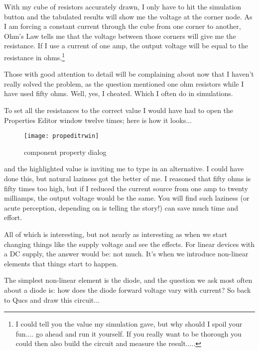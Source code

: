 \addvspace{12pt}

With my cube of resistors accurately drawn, I only have to hit the
simulation button and the tabulated results will show me the voltage
at the corner node.  As I am forcing a constant current through the
cube from one corner to another, Ohm's Law tells me that the voltage
between those corners will give me the resistance.  If I use a current
of one amp, the output voltage will be equal to the resistance in
ohms.\footnote{I could tell you the value my simulation gave, but why
should I spoil your fun.... go ahead and run it yourself. If you
really want to be thorough you could then also build the circuit and
measure the result.....}

\addvspace{12pt}

Those with good attention to detail will be complaining about now that
I haven't really solved the problem, as the question mentioned one ohm
resistors while I have used fifty ohms.  Well, yes, I cheated.  Which
I often do in simulations.

\addvspace{12pt}

To set all the resistances to the correct value I would have had to
open the Properties Editor window twelve times; here is how it
looks...

\begin{figure}[ht]
  \centering
  \texttt{[image: propeditrwin]}
  \caption{component property dialog}
  \label{fig:propeditrwin}
\end{figure}
\FloatBarrier

and the highlighted value is inviting me to type in an alternative. I
could have done this, but natural laziness got the better of me. I
reasoned that fifty ohms is fifty times too high, but if I reduced the
current source from one amp to twenty milliamps, the output voltage
would be the same.  You will find such laziness (or acute perception,
depending on is telling the story!) can save much time and effort.


All of which is interesting, but not nearly as interesting as when we
start changing things like the supply voltage and see the effects. For
linear devices with a DC supply, the answer would be: not much.  It's
when we introduce non-linear elements that things start to happen.

\addvspace{12pt}

The simplest non-linear element is the diode, and the question we ask
most often about a diode is: how does the diode forward voltage vary
with current? So back to Qucs and draw this circuit...

